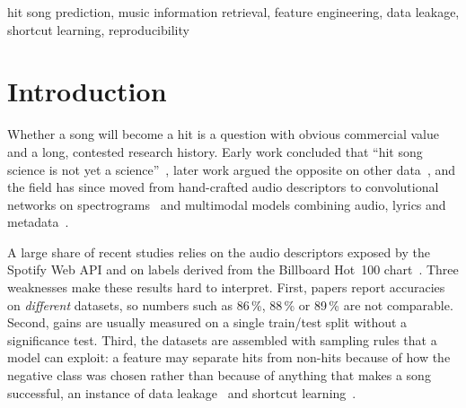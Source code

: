 \documentclass[conference]{IEEEtran}
\begin{document}
\begin{IEEEkeywords}
hit song prediction, music information retrieval, feature engineering, data leakage,
shortcut learning, reproducibility
\end{IEEEkeywords}

\section{Introduction}

Whether a song will become a hit is a question with obvious commercial value and a long,
contested research history. Early work concluded that ``hit song science is not yet a
science''~\cite{pachet2008hit}, later work argued the opposite on other
data~\cite{ni2011hit}, and the field has since moved from hand-crafted audio descriptors
to convolutional networks on spectrograms~\cite{yang2017revisiting} and multimodal models
combining audio, lyrics and metadata~\cite{zangerle2019hit,martingutierrez2020multimodal,nofer2026deephits}.

A large share of recent studies relies on the audio descriptors exposed by the Spotify
Web API and on labels derived from the Billboard Hot~100
chart~\cite{middlebrook2019song,dimolitsas2023spothitpy,zhao2023analysis,du2022spotify}.
Three weaknesses make these results hard to interpret. First, papers report accuracies on
\emph{different} datasets, so numbers such as 86\,\%, 88\,\% or 89\,\% are not
comparable. Second, gains are usually measured on a single train/test split without a
significance test. Third, the datasets are assembled with sampling rules that a model can
exploit: a feature may separate hits from non-hits because of how the negative class was
chosen rather than because of anything that makes a song successful, an instance of data
leakage~\cite{kaufman2012leakage} and shortcut learning~\cite{geirhos2020shortcut}.
\end{document}
